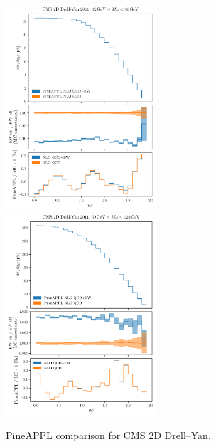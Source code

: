 \begin{figure}
    \centering
    \includegraphics[width=0.5\textwidth]{figures/pineappl_CMSDY2D11_bin3}%
    \includegraphics[width=0.5\textwidth]{figures/pineappl_CMSDY2D11_bin4}
    \caption{PineAPPL comparison for CMS 2D Drell--Yan.}
    \label{fig:cmsdy2d11_bins34}
\end{figure}


